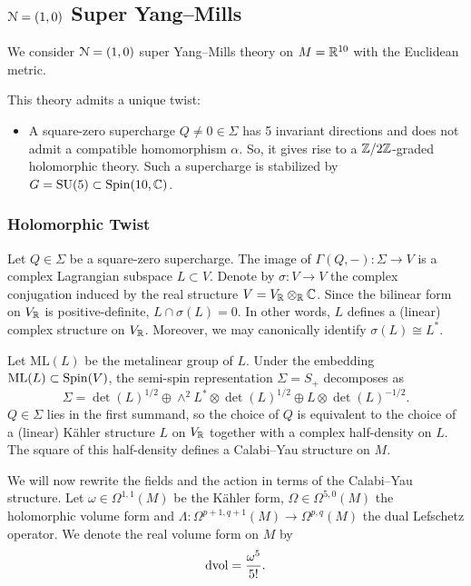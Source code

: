 \documentclass[10pt, oneside]{article}
\newcommand{\ML}{\mathrm{ML}}
\begin{document}
\subsection{\texorpdfstring{$\mathcal N=(1, 0)$}{N=(1,0)} Super Yang--Mills}

We consider $\mathcal N=(1, 0)$ super Yang--Mills theory on $M=\mathbb R^{10}$ with the Euclidean metric.

This theory admits a unique twist:
\begin{itemize}
\item A square-zero supercharge $Q\neq 0\in\Sigma$ has 5 invariant directions and does not admit a compatible homomorphism $\alpha$. So, it gives rise to a $\mathbb Z/2\mathbb Z$-graded holomorphic theory. Such a supercharge is stabilized by $G=\mathrm{SU}(5)\subset \mathrm{Spin}(10, \mathbb C)$.
\end{itemize}

\subsubsection{Holomorphic Twist}
\label{sect:10dholomorphictwist}

Let $Q\in\Sigma$ be a square-zero supercharge. The image of $\Gamma(Q, -)\colon \Sigma\rightarrow V$ is a complex Lagrangian subspace $L\subset V$. Denote by $\sigma\colon V\rightarrow V$ the complex conjugation induced by the real structure $V = V_\mathbb R\otimes_\mathbb R\mathbb C$. Since the bilinear form on $V_\mathbb R$ is positive-definite, $L\cap \sigma(L) = 0$. In other words, $L$ defines a (linear) complex structure on $V_\mathbb R$. Moreover, we may canonically identify $\sigma(L)\cong L^*$.

Let $\ML(L)$ be the metalinear group of $L$. Under the embedding $\ML(L)\subset \Spin(V)$, the semi-spin representation $\Sigma=S_+$ decomposes as
\[\Sigma = \det(L)^{1/2} \oplus \wedge^2 L^*\otimes \det(L)^{1/2}\oplus L\otimes \det(L)^{-1/2}.\]
$Q\in\Sigma$ lies in the first summand, so the choice of $Q$ is equivalent to the choice of a (linear) K\"ahler structure $L$ on $V_\mathbb R$ together with a complex half-density on $L$. The square of this half-density defines a Calabi--Yau structure on $M$.

We will now rewrite the fields and the action in terms of the Calabi--Yau structure. Let $\omega\in\Omega^{1, 1}(M)$ be the K\"ahler form, $\Omega\in\Omega^{5, 0}(M)$ the holomorphic volume form and $\Lambda\colon \Omega^{p+1, q+1}(M)\rightarrow \Omega^{p, q}(M)$ the dual Lefschetz operator. We denote the real volume form on $M$ by
\[\operatorname{dvol} = \frac{\omega^5}{5!}.\]
\end{document}
